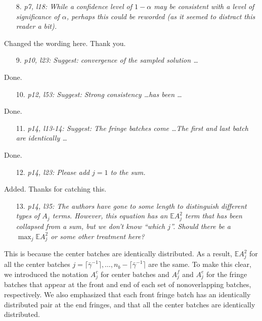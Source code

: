 \documentclass[11pt,notitlepage,onecolumn]{article}
\begin{document}
\begin{itemize}
\item[8.] \textit{p7, l18: While a confidence level of $1-\alpha$ may be consistent with a level of significance of $\alpha$, perhaps this could be reworded (as it seemed to distract this reader a bit).}
\end{itemize}

\noindent  
Changed the wording here. Thank you. 
\medskip 


\begin{itemize}
\item[9.] \textit{p10, l23: Suggest: convergence of the sampled solution \ldots}
\end{itemize}

\noindent 
Done. 
\medskip 


\begin{itemize}
\item[10.] \textit{p12, l53: Suggest: Strong consistency \ldots has been \ldots}
\end{itemize}

\noindent 
Done. 
\medskip 


\begin{itemize}
\item[11.] \textit{p14, l13-14: Suggest: The fringe batches come \ldots The first and last batch are identically \ldots}
\end{itemize}

\noindent 
Done. 
\medskip 


\begin{itemize}
\item[12.] \textit{ p14, l23: Please add $j = 1$ to the sum.}
\end{itemize}

\noindent 
Added. Thanks for catching this.
\medskip 


\begin{itemize}
\item[13.] \textit{p14, l35: The authors have gone to some length to distinguish different types of $A_j$ terms.
However, this equation has an $\mathbb{E}A_j^2$ term that has been collapsed from a sum, but we don't know ``which $j$''. 
Should there be a $\max_j \mathbb{E}A_j^2$ or some other treatment here?}
\end{itemize}

\noindent 
This is because the center batches are identically distributed. 
As a result, $\mathbb{E}A_j^2$ for all the center batches $j=\lceil \bar{\gamma}^{-1} \rceil, \ldots,n_b - \lceil \bar{\gamma}^{-1} \rceil$ are the same. 
To make this clear, we introduced the notation $A_j^c$ for center batches and $A_j^f$ and $A_j^e$ for the fringe batches that appear at the front and end of each set of nonoverlapping batches, respectively. 
We also emphasized that each front fringe batch has an identically distributed pair at the end fringes, and that all the center batches are identically distributed. 
\smallskip 
\end{document}
